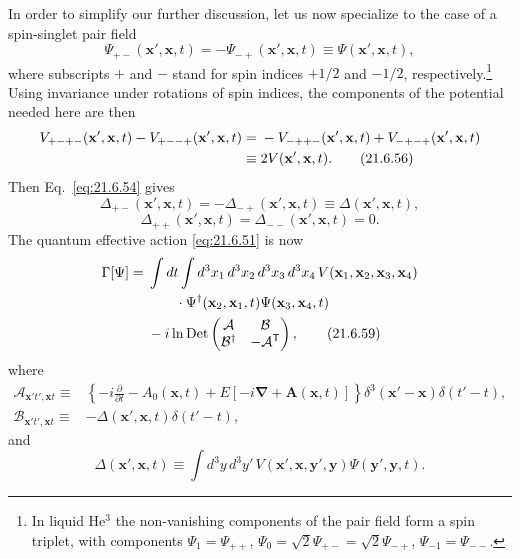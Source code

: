 In order to simplify our further discussion, let us now specialize to the case of a spin-singlet pair field
\begin{equation}
\Psi_{+-}(\mathbf x',\mathbf x,t)
=-\Psi_{-+}(\mathbf x',\mathbf x,t)
\equiv\Psi(\mathbf x',\mathbf x,t),
\tag{21.6.55}\label{eq:21.6.55}
\end{equation}
where subscripts $+$ and $-$ stand for spin indices $+1/2$ and $-1/2$, respectively.\footnote{In liquid He$^3$ the non-vanishing components of the pair field form a spin triplet, with components $\Psi_1=\Psi_{++}$, $\Psi_0=\sqrt2\Psi_{+-}=\sqrt2\Psi_{-+}$, $\Psi_{-1}=\Psi_{--}$.} Using invariance under rotations of spin indices, the components of the potential needed here are then
\begin{align}
V_{+-+-}(\mathbf x',\mathbf x,t)
-V_{+--+}(\mathbf x',\mathbf x,t)
={}&-V_{-++-}(\mathbf x',\mathbf x,t)
+V_{-+-+}(\mathbf x',\mathbf x,t)
\notag\\
\equiv{}&2V(\mathbf x',\mathbf x,t).
\tag{21.6.56}\label{eq:21.6.56}
\end{align}
Then Eq.~\eqref{eq:21.6.54} gives
\begin{equation}
\Delta_{+-}(\mathbf x',\mathbf x,t)
=-\Delta_{-+}(\mathbf x',\mathbf x,t)
\equiv\Delta(\mathbf x',\mathbf x,t),
\tag{21.6.57}\label{eq:21.6.57}
\end{equation}
\begin{equation}
\Delta_{++}(\mathbf x',\mathbf x,t)
=\Delta_{--}(\mathbf x',\mathbf x,t)=0.
\tag{21.6.58}\label{eq:21.6.58}
\end{equation}
The quantum effective action \eqref{eq:21.6.51} is now
\begin{align}
\Gamma[\Psi]
={}&\int dt\int d^3x_1\,d^3x_2\,d^3x_3\,d^3x_4\,
V(\mathbf x_1,\mathbf x_2,\mathbf x_3,\mathbf x_4)
\notag\\
&\qquad\cdot
\Psi^\dagger(\mathbf x_2,\mathbf x_1,t)
\Psi(\mathbf x_3,\mathbf x_4,t)
\notag\\
&-i\ln\operatorname{Det}
\begin{pmatrix}
\mathcal A&\mathcal B\\
\mathcal B^\dagger&-\mathcal A^{\mathsf T}
\end{pmatrix},
\tag{21.6.59}\label{eq:21.6.59}
\end{align}
where
\begin{align}
\mathcal A_{\mathbf x't',\mathbf xt}
\equiv{}&
\left\{
-i\frac{\partial}{\partial t}-A_0(\mathbf x,t)
+E[-i\boldsymbol\nabla+\mathbf A(\mathbf x,t)]
\right\}
\delta^3(\mathbf x'-\mathbf x)\delta(t'-t),
\tag{21.6.60}\label{eq:21.6.60}\\
\mathcal B_{\mathbf x't',\mathbf xt}
\equiv{}&-\Delta(\mathbf x',\mathbf x,t)\delta(t'-t),
\tag{21.6.61}\label{eq:21.6.61}
\end{align}
and
\begin{equation}
\Delta(\mathbf x',\mathbf x,t)
\equiv\int d^3y\,d^3y'\,
V(\mathbf x',\mathbf x,\mathbf y',\mathbf y)
\Psi(\mathbf y',\mathbf y,t).
\tag{21.6.62}\label{eq:21.6.62}
\end{equation}

